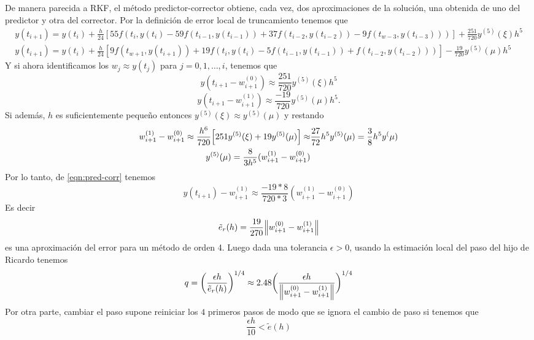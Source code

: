 De manera parecida a RKF, %
el método predictor-corrector obtiene, cada vez,
dos aproximaciones de la solución,
una obtenida de uno del predictor y otra del corrector.
Por la definición de error local de truncamiento tenemos que
\begin{gather*}
    y(t_{i+1}) = y(t_i) + \frac{h}{24}[
        55f(t_i,y(t_i) - 59f(t_{i-1},y(t_{i-1})) + 37f(t_{i-2}, y(t_{i-2}))
        - 9f(t_{w-3},y(t_{i-3})))
    ] + \frac{251}{720}y^{(5)}(\xi)h^5  \\
    y(t_{i+1}) = y(t_i) + \frac{h}{24}[
        9f(t_{w+1},y(t_{i+1})) + 19f(t_i,y(t_i) - 5f(t_{i-1},y(t_{i-1}))
        + f(t_{i-2}, y(t_{i-2})))
    ] - \frac{19}{720}y^{(5)}(\mu)h^5
\end{gather*}
Y si ahora identificamos los $w_j \approx y(t_j)$ para $j = 0,1,\dots, i$,
tenemos que
\begin{equation*} 
    y(t_{i+1} - w_{i+1}^{(0)}) \approx {} 
        \frac{251}{720}y^{(5)}(\xi)h^5
\end{equation*}
\begin{equation} \label{eqn:pred-corr}
    y(t_{i+1} - w_{i+1}^{(1)}) \approx {} 
        \frac{-19}{720}y^{(5)}(\mu)h^5.
\end{equation}
Si además, $h$ es suficientemente pequeño entonces
$y^{(5)}(\xi) \approx y^{(5)}(\mu)$
y restando
\begin{align*}
    w_{i+1}^{(1)} - w_{i+1}^{(0)} \approx 
        \frac{h^6}{720}\qty[251y^{(5)}(\xi) + 19y^{(5)}(\mu)] \approx &
        \frac{27}{72}h^5y^{(5)}(\mu) = \frac{3}{8}h^5y^(\mu) \\
    y^{(5)}(\mu) = \frac{8}{3h^5}(w_{i+1}^{(1)} - w_{i+1}^{(0)}) &
\end{align*}
Por lo tanto, de \ref{eqn:pred-corr} tenemos
\begin{equation*}
    y(t_{i+1}) - w_{i+1}^{(1)} \approx \frac{-19 * 8}{720 * 3}(w_{i+1}^{(1)} - w_{i+1}^{(0)})
\end{equation*}
Es decir
\begin{equation*}
    \tilde{e}_r(h) = \frac{19}{270}\norm{w_{i+1}^{(0)} - w_{i+1}^{(1)}}   
\end{equation*}
es una aproximación del error para un método de orden 4.
Luego dada una tolerancia $\epsilon > 0$, usando la estimación
local del paso del hijo de Ricardo tenemos
\begin{equation*}
    q = \bigg(\frac{\epsilon h}{\tilde{e}_r(h)}\bigg)^{1/4} \approx 
        2.48\bigg(\frac{\epsilon h}{\norm{w_{i+1}^{(0)} - w_{i+1}^{(1)}}}\bigg)^{1/4}
\end{equation*}
Por otra parte, cambiar el paso supone reiniciar los
$4$ primeros pasos de modo que se ignora el cambio de paso 
si tenemos que 
\begin{equation*}
    \frac{\epsilon h}{10} < \tilde{e}(h)
\end{equation*}